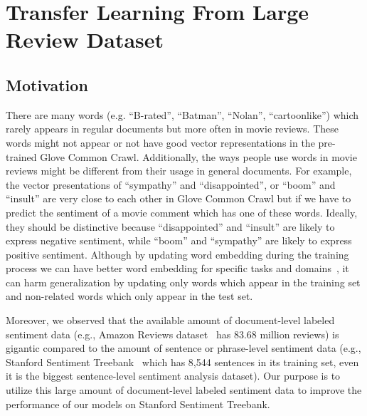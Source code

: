 \section{Transfer Learning From Large Review Dataset}
\subsection{Motivation}\label{sec:over-fitting-we}
There are many words (e.g. ``B-rated'', ``Batman'', ``Nolan'', ``cartoonlike'') which rarely appears in regular documents but more often in movie reviews.
These words might not appear or not have good vector representations in the pre-trained Glove Common Crawl.
Additionally, the ways people use words in movie reviews might be different from their usage in general documents.
For example, the vector presentations of ``sympathy'' and ``disappointed'', or ``boom'' and ``insult'' are very close to each other in Glove Common Crawl but if we have to predict the sentiment of a movie comment which has one of these words.
Ideally, they should be distinctive because ``disappointed'' and ``insult'' are likely to express negative sentiment, while ``boom'' and ``sympathy'' are likely to express positive sentiment.
Although by updating word embedding during the training process we can have better word embedding for specific tasks and domains~\cite{treeLSTM, KimCNN}, it can harm generalization by updating only words which appear in the training set and non-related words which only appear in the test set.
% 
%
%

Moreover, we observed that the available amount of document-level labeled sentiment data (e.g., Amazon Reviews dataset~\cite{amazon-reviews} has 83.68 million reviews) is gigantic compared to the amount of sentence or phrase-level sentiment data (e.g., Stanford Sentiment Treebank~\cite{socher2013recursive} which has 8,544 sentences in its training set, even it is the biggest sentence-level sentiment analysis dataset).
Our purpose is to utilize this large amount of document-level labeled sentiment data to improve the performance of our models on Stanford Sentiment Treebank.


